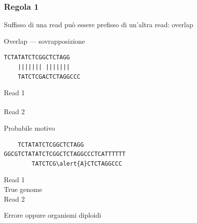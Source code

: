 \begin{frame}[fragile]
\frametitle{Regola 1}

Suffisso di una read può essere prefisso di un'altra read: overlap

\begin{block}{Overlap --- sovrapposizione}
\begin{minipage}{.68\textwidth}
\begin{Verbatim}
TCTATATCTCGGCTCTAGG
    ||||||| |||||||
    TATCTCGACTCTAGGCCC
\end{Verbatim}
\end{minipage}\hfill%
\begin{minipage}{.28\textwidth}
Read 1\\\\Read 2
\end{minipage}
\end{block}

\begin{block}{Probabile motivo}
\begin{minipage}{.68\textwidth}
\begin{Verbatim}
    TCTATATCTCGGCTCTAGG
GGCGTCTATATCTCGGCTCTAGGCCCTCATTTTTT
        TATCTCG\alert{A}CTCTAGGCCC
\end{Verbatim}
\end{minipage}\hfill%
\begin{minipage}{.28\textwidth}
Read 1\\True genome\\Read 2
\end{minipage}
\end{block}

Errore oppure organismi diploidi
\end{frame}

